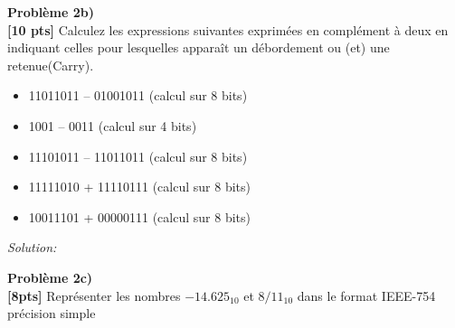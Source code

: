 \documentclass{article}
\newenvironment{problem}[2][Problème]
    { \begin{mdframed}[backgroundcolor=gray!20] \textbf{#1 #2} \\}
    {  \end{mdframed}}
\newenvironment{solution}
    {\textit{Solution:}}
    {}
\begin{document}
\begin{problem}{2b)}
\textbf{[10 pts]} Calculez les expressions suivantes exprimées en complément à deux en indiquant
celles pour lesquelles apparaît un débordement ou (et) une retenue(Carry).
\begin{itemize}
        \item 11011011 – 01001011 (calcul sur 8 bits)
        \item 1001 – 0011 (calcul sur 4 bits)
        \item 11101011 – 11011011 (calcul sur 8 bits)
        \item 11111010 + 11110111 (calcul sur 8 bits)
        \item 10011101 + 00000111 (calcul sur 8 bits)
    \end{itemize}
\end{problem}
\begin{solution}
    








\end{solution}

\begin{problem}{2c)}
\textbf{[8pts]} Représenter les nombres $-14.625_{10}$ et $8/11_{10}$ dans le format IEEE-754 précision simple
\end{problem}
\end{document}
